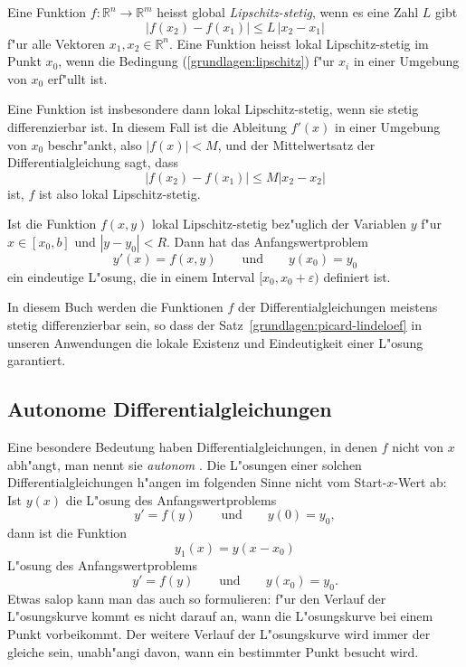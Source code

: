 \begin{definition}
Eine Funktion $f\colon \mathbb R^n\to\mathbb R^m$ heisst global
{\em Lipschitz-stetig},
wenn es eine Zahl $L$ gibt 
\begin{equation}
|f(x_2)-f(x_1)| \le L\,|x_2-x_1|
\label{grundlagen:lipschitz}
\end{equation}
f"ur alle Vektoren $x_1,x_2\in\mathbb R^n$.
Eine Funktion heisst lokal Lipschitz-stetig im Punkt $x_0$, wenn die
Bedingung (\ref{grundlagen:lipschitz}) f"ur $x_i$ in einer Umgebung von
$x_0$ erf"ullt ist.
\end{definition}

Eine Funktion ist insbesondere dann lokal Lipschitz-stetig, wenn sie
stetig differenzierbar ist.
In diesem Fall ist die Ableitung $f'(x)$ in einer Umgebung von $x_0$
beschr"ankt, also $|f(x)|<M$, und der Mittelwertsatz der Differentialgleichung
sagt, dass
\[
|f(x_2)-f(x_1)|\le M |x_2-x_2|
\]
ist, $f$ ist also lokal Lipschitz-stetig.

\begin{satz}
\label{grundlagen:picard-lindeloef}
Ist die Funktion $f(x,y)$ lokal Lipschitz-stetig bez"uglich der Variablen
$y$ f"ur $x\in[x_0,b]$ und $|y-y_0|<R$.
Dann hat das Anfangswertproblem
\[
y'(x)=f(x,y)\qquad\text{und}\qquad y(x_0)=y_0
\]
ein eindeutige L"osung, die in einem Interval $[x_0,x_0+\varepsilon)$
definiert ist.
\end{satz}

In diesem Buch werden die Funktionen $f$ der Differentialgleichungen 
meistens stetig differenzierbar sein, so dass der
Satz~\ref{grundlagen:picard-lindeloef} in unseren Anwendungen die lokale
Existenz und Eindeutigkeit einer L"osung garantiert.

\subsection{Autonome Differentialgleichungen}
Eine besondere Bedeutung haben Differentialgleichungen, in denen
$f$ nicht von $x$ abh"angt, man nennt sie {\em autonom}
.
Die L"osungen einer solchen Differentialgleichungen h"angen im
folgenden Sinne nicht vom Start-$x$-Wert ab:
Ist $y(x)$ die L"osung des Anfangswertproblems
\[
y'=f(y)\qquad\text{und}\qquad y(0)=y_0,
\]
dann ist die Funktion
\[
y_1(x)=y(x-x_0)
\]
L"osung des Anfangswertproblems
\[
y'=f(y)\qquad\text{und}\qquad y(x_0)=y_0.
\]
Etwas salop kann man das auch so formulieren: f"ur den Verlauf der 
L"osungskurve kommt es nicht darauf an, wann die L"osungskurve bei 
einem Punkt vorbeikommt.
Der weitere Verlauf der L"osungskurve wird immer der gleiche sein,
unabh"angi davon, wann ein bestimmter Punkt besucht wird.

